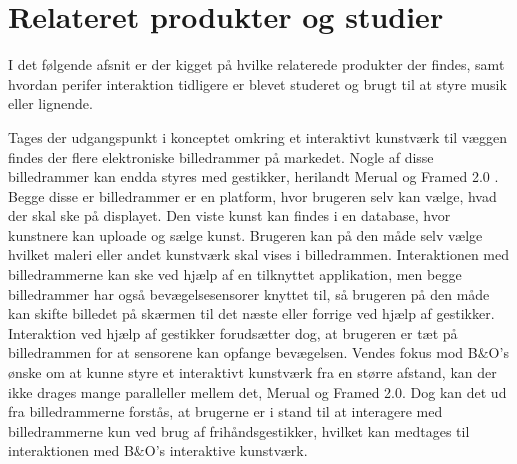 \section{Relateret produkter og studier}
\label{RelateretProdukterOgStudier}

I det følgende afsnit er der kigget på hvilke relaterede produkter der findes, samt hvordan perifer interaktion tidligere er blevet studeret og brugt til at styre musik eller lignende.

Tages der udgangspunkt i konceptet omkring et interaktivt kunstværk til væggen findes der flere elektroniske billedrammer på markedet. Nogle af disse billedrammer kan endda styres med gestikker, herilandt Merual \parencite{WEB:Meural} og Framed 2.0 \parencite{WEB:Framed2.0}. Begge disse er billedrammer er en platform, hvor brugeren selv kan vælge, hvad der skal ske på displayet. Den viste kunst kan findes i en database, hvor kunstnere kan uploade og sælge kunst. Brugeren kan på den måde selv vælge hvilket maleri eller andet kunstværk skal vises i billedrammen. Interaktionen med billedrammerne kan ske ved hjælp af en tilknyttet applikation, men begge billedrammer har også bevægelsesensorer knyttet til, så brugeren på den måde kan skifte billedet på skærmen til det næste eller forrige ved hjælp af gestikker. Interaktion ved hjælp af gestikker forudsætter dog, at brugeren er tæt på billedrammen for at sensorene kan opfange bevægelsen. Vendes fokus mod B$\&$O's ønske om at kunne styre et interaktivt kunstværk fra en større afstand, kan der ikke drages mange paralleller mellem det, Merual og Framed 2.0. Dog kan det ud fra billedrammerne forstås, at brugerne er i stand til at interagere med billedrammerne kun ved brug af frihåndsgestikker, hvilket kan medtages til interaktionen med B$\&$O's interaktive kunstværk.

